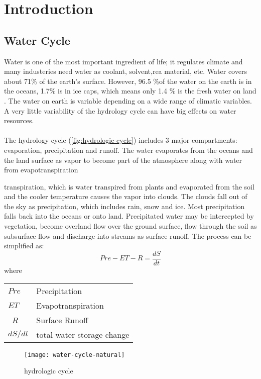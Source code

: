 \chapter{Introduction}
\section{Water Cycle}
Water is one of the most important ingredient of life; it regulates climate and many industeries need water as coolant, solvent,rea material, etc. Water covers about 71\% of the earth's surface. However, 96.5 \%of the water on the earth is in the oceans, 1.7\% is in ice caps, which means only 1.4 \% is the fresh water on land \cite{gleick1993water}. The water on earth is variable depending on a wide range of climatic variables. A very little variability of the hydrology cycle can have big effects on water resources. \cite{evans1996effects}\\\\
The hydrology cycle (\autoref{fig:hydrologic cycle}) includes 3 major compartments: evaporation, precipitation and runoff. The water evaporates from the oceans and the land surface as vapor to become part of the atmosphere along with water from evapotranspiration

transpiration, which is water transpired from plants and evaporated from the soil and the cooler temperature causes the vapor into clouds. The clouds fall out of the sky as precipitation, which includes rain, snow and ice. Most precipitation falls back into the oceans or onto land. Precipitated water may be intercepted by vegetation, become overland flow over the ground surface, flow through the soil as subsurface flow and discharge into streams as surface runoff. The process can be simplified as:
\begin{equation}\label{equa:waterbalence}
	 Pre - ET - R = \frac{dS}{dt}
\end{equation}
where
\begin{table}[htbp]
	\begin{tabular}{ll}
		$Pre$   & Precipitation    \\ 
		$ET$    & Evapotranspiration \\ \
		$R$     & Surface Runoff \\ 
		$dS / dt$ & total water storage change \\ 
	\end{tabular}
\end{table}
\begin{figure}[htbp]
	\centering
	\texttt{[image: water-cycle-natural]} %
	\caption{hydrologic cycle} 
	\label{fig:hydrologic cycle}
\end{figure}
